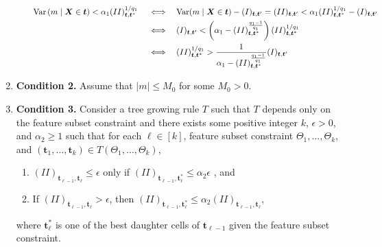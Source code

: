 \begin{enumerate}
\begin{itemize}
\begin{align*}
\mathrm{Var} \left(m \mid \boldsymbol{X} \in \boldsymbol{t} \right) < \alpha_1  (II)_{\boldsymbol{t}, \boldsymbol{t}^*}^{1/q_1}  \quad \iff \quad  &  \mathrm{Var}(m \mid \boldsymbol{X} \in \boldsymbol{t}) - (I)_{\boldsymbol{t}, \boldsymbol{t}'} = (II)_{\boldsymbol{t}, \boldsymbol{t}'}  < \alpha_1  (II)_{\boldsymbol{t}, \boldsymbol{t}^*}^{1/q_1}  - (I)_{\boldsymbol{t}, \boldsymbol{t}'} 
\\  \iff \quad  & (I)_{\boldsymbol{t}, \boldsymbol{t}'}  < \left(\alpha_1 -  (II)_{\boldsymbol{t}, \boldsymbol{t}^*}^{\frac{q_1 - 1}{q_1}} \right)  (II)_{\boldsymbol{t}, \boldsymbol{t}^*}^{1/q_1}
\\  \iff \quad  & (II)_{\boldsymbol{t}, \boldsymbol{t}^*}^{1/q_1}  > \frac{1}{\alpha_1 -  (II)_{\boldsymbol{t}, \boldsymbol{t}^*}^{\frac{q_1 - 1}{q_1}}} (I)_{\boldsymbol{t}, \boldsymbol{t}'}
\end{align*}

\end{itemize}

\item \textbf{Condition 2.} Assume that \(|m| \leq M_0\) for some \(M_0 > 0\).

\item \textbf{Condition 3.} Consider a tree growing rule \(T\) such that \(T\) depends only on the feature subset constraint and there exists some positive integer \(k\), \(\epsilon > 0\), and \(\alpha_2 \geq 1\) such that for each \(\ell \in [k]\), feature subset constraint \(\Theta_1, \ldots, \Theta_k\), and \((\boldsymbol{t}_1, \ldots, \boldsymbol{t}_k) \in T(\Theta_1, \ldots, \Theta_k)\), 

\begin{enumerate}

\item \((II)_{\boldsymbol{t}_{\ell - 1}, \boldsymbol{t}_\ell} \leq \epsilon\) only if \((II)_{\boldsymbol{t}_{\ell - 1}, \boldsymbol{t}_\ell^*} \leq  \alpha_2\epsilon\) , and

\item If  \((II)_{\boldsymbol{t}_{\ell - 1}, \boldsymbol{t}_\ell} > \epsilon\), then \((II)_{\boldsymbol{t}_{\ell - 1}, \boldsymbol{t}_\ell^*} \leq  \alpha_2(II)_{\boldsymbol{t}_{\ell - 1}, \boldsymbol{t}_\ell}\),

\end{enumerate}

where \(\boldsymbol{t}_\ell^*\) is one of the best daughter cells of \(\boldsymbol{t}_{\ell - 1}\) given the feature subset constraint.

\end{enumerate}

